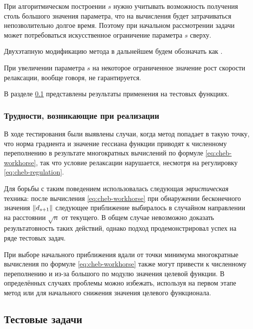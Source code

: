 При алгоритмическом построении $s$ нужно учитывать возможность
получения столь большого значения параметра, что на вычисления будет
затрачиваться непозволительно долгое время. Поэтому при начальном
рассмотрении задачи может потребоваться искусственное ограничение
параметра $s$ сверху.

Двухэтапную модификацию метода \relch{} в дальнейшем будем обозначать
как \gdrelch{}.

\begin{rem}
  \label{rem:cheb-rel-speed}
  При увеличении параметра $s$ на некоторое ограниченное значение рост
  скорости релаксации, вообще говоря, не гарантируется.
\end{rem}

В разделе \ref{sec:test-problems} представлены результаты применения
\gdrelch{} на тестовых функциях.

\subsubsection{Трудности, возникающие при реализации \relch{}}

В ходе тестирования \relch{} были выявлены случаи, когда метод
попадает в такую точку, что норма градиента и значение гессиана
функции приводят к численному переполнению в результате многократных
вычислений по формуле \eqref{eq:cheb-workhorse}, так что условие
релаксации нарушается, несмотря на регулировку
\eqref{eq:cheb-regulation}.

Для борьбы с таким поведением использовалась следующая
\emph{эвристическая} техника: после вычисления
\eqref{eq:cheb-workhorse} при обнаружении бесконечного значения
$\left \lVert{d_{s+1}}\right \rVert$ следующее приближение выбиралось в случайном
направлении на расстоянии $\sqrt{n}$ от текущего. В общем случае
невозможно доказать результатовность таких действий, однако подход
продемонстрировал успех на ряде тестовых задач.

При выборе начального приближения вдали от точки минимума многократные
вычисления по формуле \eqref{eq:cheb-workhorse} также могут привести к
численному переполнению и из-за большого по модулю значения целевой
функции. В определённых случаях проблемы можно избежать, используя на
первом этапе метод \gd{} или \rgd{} для начального снижения значения
целевого функционала.

\clearpage
\subsection{Тестовые задачи}
\label{sec:test-problems}

